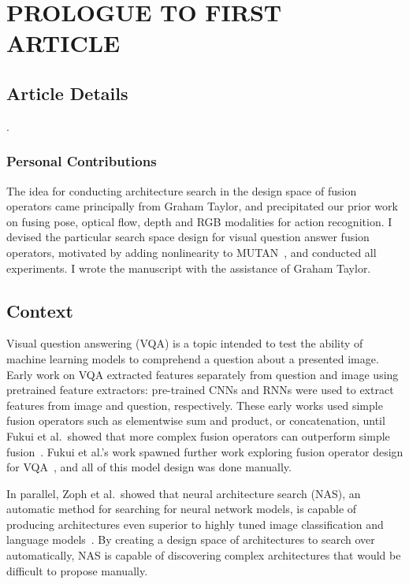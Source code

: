 \chapter{PROLOGUE TO FIRST ARTICLE}


\section{Article Details}

.

\subsection{Personal Contributions}

The idea for conducting architecture search in the design space of fusion
operators came principally from Graham Taylor, and precipitated our prior work on
fusing pose, optical flow, depth and RGB modalities for action recognition.
I devised the particular search space design for visual question answer fusion
operators, motivated by adding nonlinearity to MUTAN~\cite{ben2017mutan}, and
conducted all experiments.
I wrote the manuscript with the assistance of Graham Taylor.


\section{Context}

Visual question answering (VQA) is a topic intended to test the ability of
machine learning models to comprehend a question about a presented image.
Early work on VQA extracted features separately from question and image using
pretrained feature extractors: pre-trained CNNs and RNNs were used to extract
features from image and question, respectively.
These early works used simple fusion operators such as elementwise sum and
product, or concatenation, until Fukui et al.\ showed that more complex fusion
operators can outperform simple fusion~\cite{fukui2016multimodalCB}.
Fukui et al.'s work spawned further work exploring fusion operator design for
VQA~\cite{Kim2017, ben2017mutan}, and all of this model design was done
manually.

In parallel, Zoph et al.\ showed that neural architecture
search (NAS), an automatic method for searching for neural network models, is
capable of producing architectures even superior to highly tuned image
classification and language models~\cite{zoph2016neural}.
By creating a design space of architectures to search over automatically, NAS
is capable of discovering complex architectures that would be difficult to
propose manually.

